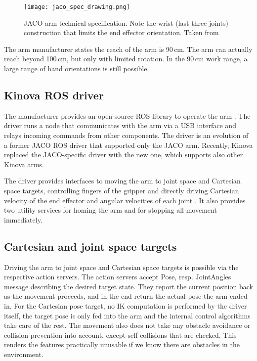 \documentclass[buriama8_dp.tex]{subfiles}
\begin{document}
\begin{figure}[ht]
  \centering
  \texttt{[image: jaco\_spec\_drawing.png]}
  \caption[JACO blueprint]{JACO arm technical specification. Note the wrist (last three joints) construction that limits the end effector orientation. Taken from \cite{jaco_spec}}
  \label{fig:jaco_schema}
\end{figure}

The arm manufacturer states the reach of the arm is 90\,cm. The arm can actually reach beyond 100\,cm, but only with limited rotation. In the 90\,cm work range, a large range of hand orientations is still possible.

\subsection{Kinova ROS driver}
\label{subsec:kinova_ros}

The manufacturer provides an open-source ROS library to operate the arm \cite{kinova_ros}. The driver runs a node that communicates with the arm via a USB interface and relays incoming commands from other components. The driver is an evolution of a former JACO ROS driver that supported only the JACO arm. Recently, Kinova replaced the JACO-specific driver with the new one, which supports also other Kinova arms.

The driver provides interfaces to moving the arm to joint space and Cartesian space targets, controlling fingers of the gripper and directly driving Cartesian velocity of the end effector and angular velocities of each joint \cite{kinova_ros_api}. It also provides two utility services for homing the arm and for stopping all movement immediately.

\subsection{Cartesian and joint space targets}
\label{subsec:api_cart_action}

Driving the arm to joint space and Cartesian space targets is possible via the respective action servers. The action servers accept Pose, resp. JointAngles message describing the desired target state. They report the current position back as the movement proceeds, and in the end return the actual pose the arm ended in. For the Cartesian pose target, no IK computation is performed by the driver itself, the target pose is only fed into the arm and the internal control algorithms take care of the rest. The movement also does not take any obstacle avoidance or collision prevention into account, except self-collisions that are checked. This renders the features practically unusable if we know there are obstacles in the environment.
\end{document}
